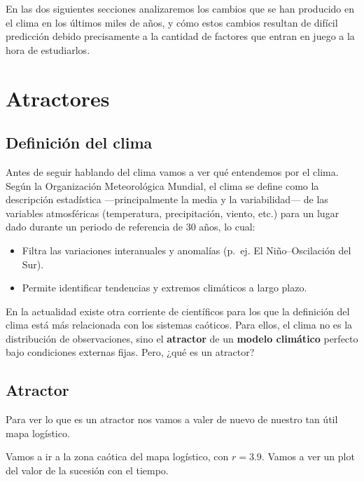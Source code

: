 \documentclass[
  10pt,
  a4paper,
  DIV=11,
  numbers=noendperiod,
  open=any]{scrreprt}
\numberwithin{equation}{chapter}
\numberwithin{equation}{section}
\renewcommand{\[}{\begin{equation}}
\renewcommand{\]}{\end{equation}}
\begin{document}
En las dos siguientes secciones analizaremos los cambios que se han
producido en el clima en los últimos miles de años, y cómo estos cambios
resultan de difícil predicción debido precisamente a la cantidad de
factores que entran en juego a la hora de estudiarlos.

\chapter{Atractores}\label{atractores}

\section{Definición del clima}\label{definiciuxf3n-del-clima}

Antes de seguir hablando del clima vamos a ver qué entendemos por el
clima. Según la Organización Meteorológica Mundial, el clima se define
como la descripción estadística ---principalmente la media y la
variabilidad--- de las variables atmosféricas (temperatura,
precipitación, viento, etc.) para un lugar dado durante un periodo de
referencia de 30 años, lo cual:

\begin{itemize}
\item
  Filtra las variaciones interanuales y anomalías (p.~ej. El
  Niño--Oscilación del Sur).
\item
  Permite identificar tendencias y extremos climáticos a largo plazo.
\end{itemize}

En la actualidad existe otra corriente de científicos para los que la
definición del clima está más relacionada con los sistemas caóticos.
Para ellos, el clima no es la distribución de observaciones, sino el
\textbf{atractor} de un \textbf{modelo climático} perfecto bajo
condiciones externas fijas. Pero, ¿qué es un atractor?

\section{Atractor}\label{atractor}

Para ver lo que es un atractor nos vamos a valer de nuevo de nuestro tan
útil mapa logístico.

Vamos a ir a la zona caótica del mapa logístico, con \(r=3.9\). Vamos a
ver un plot del valor de la sucesión con el tiempo.
\end{document}
